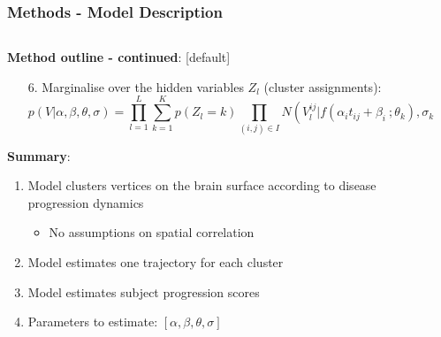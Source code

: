 \documentclass[8pt,xcolor=table]{beamer}
\begin{document}
\begin{frame}
\frametitle{Methods - Model Description}

\begin{columns}[T]
    \hspace{-4em}
    \begin{column}{.65\textwidth}
   
    \textbf{Method outline - continued}:
    [default]
     \begin{enumerate}      
          
      \item[6.] Marginalise over the hidden variables $Z_l$ (cluster assignments):
      \small{$$p(V|\alpha, \beta, \theta, \sigma) = \prod_{l=1}^L \sum_{k=1}^K p(Z_l = k) \prod_{(i,j) \in I} N(V_l^{ij} | f(\alpha_i t_{ij} + \beta_i \ ; \theta_k), \sigma_k)$$}
       \end{enumerate}
       
    \textbf{Summary}:
      \begin{enumerate}  
       \item Model clusters vertices on the brain surface according to disease progression dynamics
       \begin{itemize}
        \item No assumptions on spatial correlation
       \end{itemize}
       \item Model estimates one trajectory for each cluster
       \item Model estimates subject progression scores
       \item Parameters to estimate: $\left[\alpha, \beta, \theta, \sigma \right]$
      
     \end{enumerate}
     

    \end{column}
    \hspace{-3em}
    \begin{column}{.25\textwidth}
    

\end{column}
\end{columns}
\end{frame}
\end{document}
